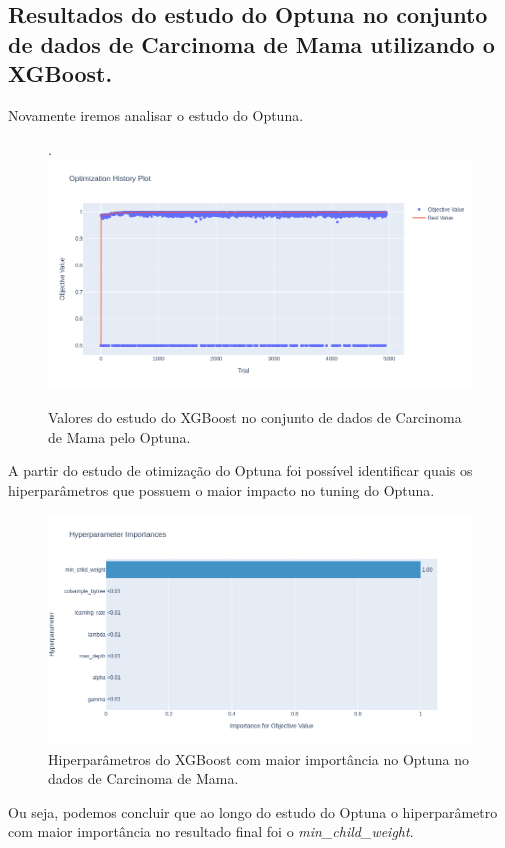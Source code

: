 \subsection{Resultados do estudo do Optuna no conjunto de dados de Carcinoma de Mama utilizando o XGBoost.}
Novamente iremos analisar o estudo do Optuna.
\begin{figure}[H]
 \caption{Valores do estudo do XGBoost no conjunto de dados de Carcinoma de Mama pelo Optuna.}.
 \label{fig:op:cancer:trials:xgb}
 \centering
 \includegraphics[scale=0.4]{images/optuna_xgboost_cancer.png}
\end{figure}
A partir do estudo de otimização do Optuna foi possível identificar quais os hiperparâmetros que possuem o maior impacto no tuning do Optuna.
\begin{figure}[H]
 \caption{Hiperparâmetros do XGBoost com maior importância no Optuna no dados de Carcinoma de Mama.}
 \label{fig:op:cancer:impo:xgb}
 \centering
 \includegraphics[scale=0.4]{images/optuna_xgboost_imporatnce_cancer.png}
\end{figure}
Ou seja, podemos concluir que ao longo do estudo do Optuna o hiperparâmetro com maior importância no resultado final foi o \textit{min\_child\_weight}.

